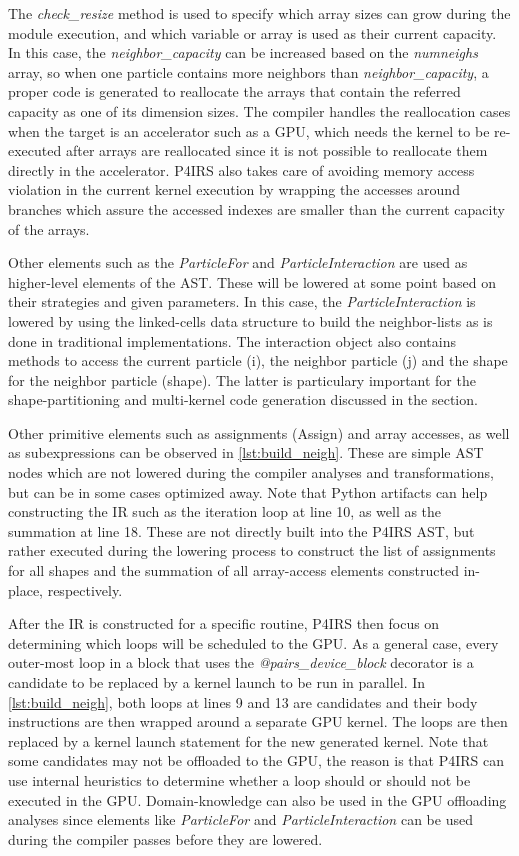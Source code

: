 \documentclass[Afour,sageh,times]{sagej}
\begin{document}
The \emph{check\_resize} method is used to specify which array sizes can grow during the module execution, and which variable or array is used as their current capacity.
In this case, the \emph{neighbor\_capacity} can be increased based on the \emph{numneighs} array, so when one particle contains more neighbors than \emph{neighbor\_capacity}, a proper code is generated to reallocate the arrays that contain the referred capacity as one of its dimension sizes.
The compiler handles the reallocation cases when the target is an accelerator such as a GPU, which needs the kernel to be re-executed after arrays are reallocated since it is not possible to reallocate them directly in the accelerator.
P4IRS also takes care of avoiding memory access violation in the current kernel execution by wrapping the accesses around branches which assure the accessed indexes are smaller than the current capacity of the arrays.

Other elements such as the \emph{ParticleFor} and \emph{ParticleInteraction} are used as higher-level elements of the AST.
These will be lowered at some point based on their strategies and given parameters.
In this case, the \emph{ParticleInteraction} is lowered by using the linked-cells data structure to build the neighbor-lists as is done in traditional implementations.
The interaction object also contains methods to access the current particle (i), the neighbor particle (j) and the shape for the neighbor particle (shape).
The latter is particulary important for the shape-partitioning and multi-kernel code generation discussed in the  section.

Other primitive elements such as assignments (Assign) and array accesses, as well as subexpressions can be observed in \autoref{lst:build_neigh}.
These are simple AST nodes which are not lowered during the compiler analyses and transformations, but can be in some cases optimized away.
Note that Python artifacts can help constructing the IR such as the iteration loop at line 10, as well as the summation at line 18.
These are not directly built into the P4IRS AST, but rather executed during the lowering process to construct the list of assignments for all shapes and the summation of all array-access elements constructed in-place, respectively.

After the IR is constructed for a specific routine, P4IRS then focus on determining which loops will be scheduled to the GPU.
As a general case, every outer-most loop in a block that uses the \emph{@pairs\_device\_block} decorator is a candidate to be replaced by a kernel launch to be run in parallel.
In \autoref{lst:build_neigh}, both loops at lines 9 and 13 are candidates and their body instructions are then wrapped around a separate GPU kernel.
The loops are then replaced by a kernel launch statement for the new generated kernel.
Note that some candidates may not be offloaded to the GPU, the reason is that P4IRS can use internal heuristics to determine whether a loop should or should not be executed in the GPU.
Domain-knowledge can also be used in the GPU offloading analyses since elements like \emph{ParticleFor} and \emph{ParticleInteraction} can be used during the compiler passes before they are lowered.
\end{document}
